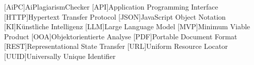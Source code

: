 \addchap*{\langacronyms}
\begin{acronym}
    [AiPC]{AiPlagiarismChecker}
    [API]{Application Programming Interface}
    [HTTP]{Hypertext Transfer Protocol}
    [JSON]{JavaScript Object Notation}
    [KI]{Künstliche Intelligenz}
    [LLM]{Large Language Model}
    [MVP]{Minimum Viable Product}
    [OOA]{Objektorientierte Analyse}
    [PDF]{Portable Document Format}
    [REST]{Representational State Transfer}
    [URL]{Uniform Resource Locator}
    [UUID]{Universally Unique Identifier}
\end{acronym}